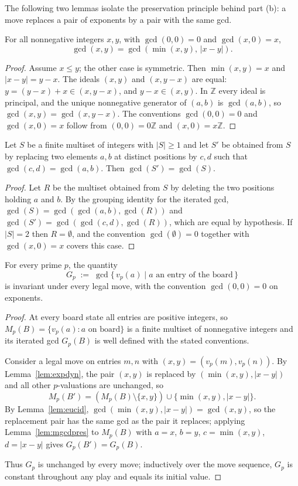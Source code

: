 \documentclass{article}
\begin{document}
The following two lemmas isolate the preservation principle behind part (b):
a move replaces a pair of exponents by a pair with the same gcd.

\begin{lemma}\label{lem:eucid}
For all nonnegative integers $x,y$, with $\gcd(0,0)=0$ and $\gcd(x,0)=x$,
\[
\gcd(x,y)=\gcd(\min(x,y),\,|x-y|).
\]
\end{lemma}
\begin{proof}
Assume $x\leq y$; the other case is symmetric. Then $\min(x,y)=x$ and
$|x-y|=y-x$. The ideals $(x,y)$ and $(x,y-x)$ are equal: $y=(y-x)+x\in(x,y-x)$,
and $y-x\in(x,y)$. In $\mathbb{Z}$ every ideal is principal, and the unique
nonnegative generator of $(a,b)$ is $\gcd(a,b)$, so
$\gcd(x,y)=\gcd(x,y-x)$. The conventions $\gcd(0,0)=0$ and $\gcd(x,0)=x$ follow
from $(0,0)=0\mathbb{Z}$ and $(x,0)=x\mathbb{Z}$.
\end{proof}

\begin{lemma}\label{lem:mgcdpres}
Let $S$ be a finite multiset of integers with $|S|\geq 1$ and let $S'$ be
obtained from $S$ by replacing two elements $a,b$ at distinct positions by
$c,d$ such that $\gcd(c,d)=\gcd(a,b)$. Then $\gcd(S')=\gcd(S)$.
\end{lemma}
\begin{proof}
Let $R$ be the multiset obtained from $S$ by deleting the two positions holding
$a$ and $b$. By the grouping identity for the iterated gcd,
$\gcd(S)=\gcd(\gcd(a,b),\gcd(R))$ and
$\gcd(S')=\gcd(\gcd(c,d),\gcd(R))$, which are equal by hypothesis. If $|S|=2$
then $R=\emptyset$, and the convention $\gcd(\emptyset)=0$ together with
$\gcd(x,0)=x$ covers this case.
\end{proof}

\begin{lemma}\label{lem:inv}
For every prime $p$, the quantity
\[
G_p \;:=\; \gcd\{\,v_p(a)\mid a\text{ an entry of the board}\,\}
\]
is invariant under every legal move, with the convention $\gcd(0,0)=0$ on
exponents.
\end{lemma}
\begin{proof}
At every board state all entries are positive integers, so
$M_p(B)=\{v_p(a):a\text{ on board}\}$ is a finite multiset of nonnegative
integers and its iterated gcd $G_p(B)$ is well defined with the stated
conventions.

Consider a legal move on entries $m,n$ with $(x,y)=(v_p(m),v_p(n))$. By
Lemma~\ref{lem:expdyn}, the pair $(x,y)$ is replaced by
$(\min(x,y),|x-y|)$ and all other $p$-valuations are unchanged, so
\[
M_p(B') = (M_p(B)\setminus\{x,y\})\cup\{\min(x,y),|x-y|\}.
\]
By Lemma~\ref{lem:eucid}, $\gcd(\min(x,y),|x-y|)=\gcd(x,y)$, so the
replacement pair has the same gcd as the pair it replaces; applying
Lemma~\ref{lem:mgcdpres} to $M_p(B)$ with $a=x$, $b=y$, $c=\min(x,y)$,
$d=|x-y|$ gives $G_p(B')=G_p(B)$.

Thus $G_p$ is unchanged by every move; inductively over the move sequence,
$G_p$ is constant throughout any play and equals its initial value.
\end{proof}
\end{document}
